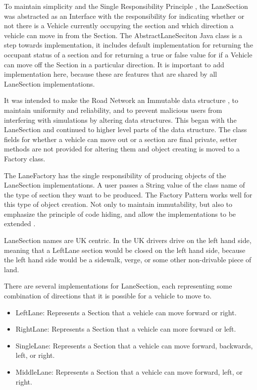 \documentclass[11pt]{article}
\begin{document}
{\begin{itemize}
    To maintain simplicity and the Single Responsibility Principle \cite{website:Principles-of-OOD}, the LaneSection was abstracted as an Interface with the responsibility for indicating whether or not there is a Vehicle currently occupying the section and which direction a vehicle can move in from the Section. The AbstractLaneSeciton Java class is a step towards implementation, it includes default implementation for returning the occupant status of a section and for returning a true or false value for if a Vehicle can move off the Section in a particular direction. It is important to add implementation here, because these are features that are shared by all LaneSection implementations.
    
    It was intended to make the Road Network an Immutable data structure \cite{website:Oracle-Imm-Obj}, to maintain uniformity and reliability, and to prevent malicious users from interfering with simulations by altering data structures. This began with the LaneSection and continued to higher level parts of the data structure. The class fields for whether a vehicle can move out or a section are final private, setter methods are not provided for altering them and object creating is moved to a Factory class.
    
    The LaneFactory has the single responsibility of producing objects of the LaneSection implementations. A user passes a String value of the class name of the type of section they want to be produced. The Factory Pattern works well for this type of object creation. Not only to maintain immutability, but also to emphasize the principle of code hiding, and allow the implementations to be extended \cite{HeadFirstFreeman}.
    
    LaneSection names are UK centric. In the UK drivers drive on the left hand side, meaning that a LeftLane section would be closed on the left hand side, because the left hand side would be a sidewalk, verge, or some other non-drivable piece of land.
    
    There are several implementations for LaneSection, each representing some combination of directions that it is possible for a vehicle to move to.
    
    \begin{itemize}[noitemsep]
    \item LeftLane: Represents a Section that a vehicle can move forward or right.
    \item RightLane: Represents a Section that a vehicle can more forward or left.
    \item SingleLane: Represents a Section that a vehicle can move forward, backwards, left, or right.
    \item MiddleLane: Represents a Section that a vehicle can move forward, left, or right.
    \end{itemize}

\end{itemize}}
\end{document}
